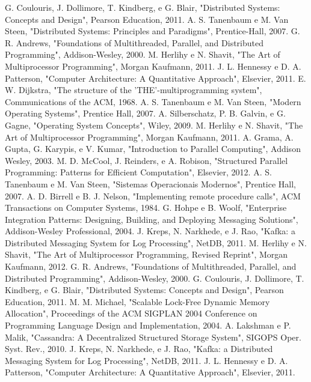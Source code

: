 \documentclass[conference]{IEEEtran}
\begin{document}
\begin{thebibliography}{00} 
     G. Coulouris, J. Dollimore, T. Kindberg, e G. Blair, "Distributed Systems: Concepts and Design", Pearson Education, 2011.
     A. S. Tanenbaum e M. Van Steen, "Distributed Systems: Principles and Paradigms", Prentice-Hall, 2007.
     G. R. Andrews, "Foundations of Multithreaded, Parallel, and Distributed Programming", Addison-Wesley, 2000.
     M. Herlihy e N. Shavit, "The Art of Multiprocessor Programming", Morgan Kaufmann, 2011.
     J. L. Hennessy e D. A. Patterson, "Computer Architecture: A Quantitative Approach", Elsevier, 2011.
     E. W. Dijkstra, "The structure of the 'THE'-multiprogramming system", Communications of the ACM, 1968.
     A. S. Tanenbaum e M. Van Steen, "Modern Operating Systems", Prentice Hall, 2007.
     A. Silberschatz, P. B. Galvin, e G. Gagne, "Operating System Concepts", Wiley, 2009.
     M. Herlihy e N. Shavit, "The Art of Multiprocessor Programming", Morgan Kaufmann, 2011.
     A. Grama, A. Gupta, G. Karypis, e V. Kumar, "Introduction to Parallel Computing", Addison Wesley, 2003.
     M. D. McCool, J. Reinders, e A. Robison, "Structured Parallel Programming: Patterns for Efficient Computation", Elsevier, 2012.
     A. S. Tanenbaum e M. Van Steen, "Sistemas Operacionais Modernos", Prentice Hall, 2007.
     A. D. Birrell e B. J. Nelson, "Implementing remote procedure calls", ACM Transactions on Computer Systems, 1984.
     G. Hohpe e B. Woolf, "Enterprise Integration Patterns: Designing, Building, and Deploying Messaging Solutions", Addison-Wesley Professional, 2004.
     J. Kreps, N. Narkhede, e J. Rao, "Kafka: a Distributed Messaging System for Log Processing", NetDB, 2011.
     M. Herlihy e N. Shavit, "The Art of Multiprocessor Programming, Revised Reprint", Morgan Kaufmann, 2012.
     G. R. Andrews, "Foundations of Multithreaded, Parallel, and Distributed Programming", Addison-Wesley, 2000.
     G. Coulouris, J. Dollimore, T. Kindberg, e G. Blair, "Distributed Systems: Concepts and Design", Pearson Education, 2011.
     M. M. Michael, "Scalable Lock-Free Dynamic Memory Allocation", Proceedings of the ACM SIGPLAN 2004 Conference on Programming Language Design and Implementation, 2004.
     A. Lakshman e P. Malik, "Cassandra: A Decentralized Structured Storage System", SIGOPS Oper. Syst. Rev., 2010.
     J. Kreps, N. Narkhede, e J. Rao, "Kafka: a Distributed Messaging System for Log Processing", NetDB, 2011.
     J. L. Hennessy e D. A. Patterson, "Computer Architecture: A Quantitative Approach", Elsevier, 2011.
\end{thebibliography}
\end{document}
